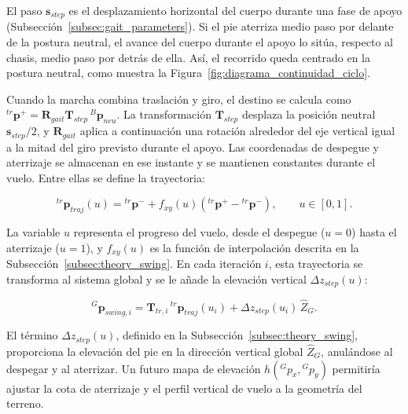 El paso $\bm{s}_{step}$ es el desplazamiento horizontal del cuerpo durante una fase de apoyo (Subsección~\ref{subsec:gait_parameters}). Si el pie aterriza medio paso por delante de la postura neutral, el avance del cuerpo durante el apoyo lo sitúa, respecto al chasis, medio paso por detrás de ella. Así, el recorrido queda centrado en la postura neutral, como muestra la Figura~\ref{fig:diagrama_continuidad_ciclo}.

Cuando la marcha combina traslación y giro, el destino se calcula como ${}^{tr}\bm{p}^{+}=\mathbf{R}_{gait}\mathbf{T}_{step}\,{}^{B}\bm{p}_{neu}$. La transformación $\mathbf{T}_{step}$ desplaza la posición neutral $\bm{s}_{step}/2$, y $\mathbf{R}_{gait}$ aplica a continuación una rotación alrededor del eje vertical igual a la mitad del giro previsto durante el apoyo. Las coordenadas de despegue y aterrizaje se almacenan en ese instante y se mantienen constantes durante el vuelo. Entre ellas se define la trayectoria:

\vspace{-0.5\baselineskip}
\begin{equation}
    {}^{tr}\bm{p}_{traj}(u)
    = {}^{tr}\bm{p}^{-}
    + f_{xy}(u)\left({}^{tr}\bm{p}^{+}-{}^{tr}\bm{p}^{-}\right),
    \qquad u\in[0,1].
    \label{eq:swing_latched_interp}
\end{equation}
\vspace{-1\baselineskip}

La variable $u$ representa el progreso del vuelo, desde el despegue ($u=0$)
hasta el aterrizaje ($u=1$), y $f_{xy}(u)$ es la función de interpolación descrita en la Subsección~\ref{subsec:theory_swing}. En cada iteración $i$, esta trayectoria se transforma al sistema global y se le añade la elevación vertical $\Delta z_{step}(u)$:

\vspace{-0.5\baselineskip}
\begin{equation}
    {}^{G}\bm{p}_{swing,i}
    = \mathbf{T}_{tr,i}\,{}^{tr}\bm{p}_{traj}(u_i)
    + \Delta z_{step}(u_i)\,\hat{Z}_G.
    \label{eq:swing_global_calc}
\end{equation}
\vspace{-1\baselineskip}

El término $\Delta z_{step}(u)$, definido en la Subsección~\ref{subsec:theory_swing}, proporciona la elevación del pie en la dirección vertical global $\hat{Z}_G$, anulándose al despegar y al aterrizar. Un futuro mapa de elevación $h({}^{G}p_x,{}^{G}p_y)$ permitiría ajustar la cota de aterrizaje y el perfil vertical de vuelo a la geometría del terreno.

